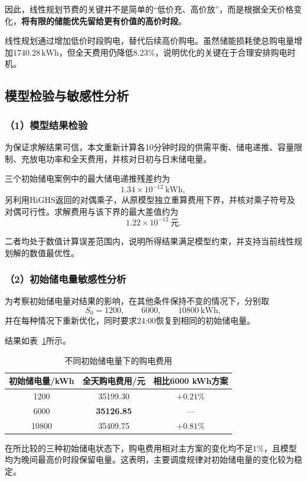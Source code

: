 因此，线性规划节费的关键并不是简单的“低价充、高价放”，而是根据全天价格变化，\textbf{将有限的储能优先留给更有价值的高价时段}。

线性规划通过增加低价时段购电，替代后续高价购电。虽然储能损耗使总购电量增加\(1740.28\,\mathrm{kWh}\)，但全天费用仍降低8.23\%，说明优化的关键在于合理安排购电时机。

\subsection{模型检验与敏感性分析}

\subsubsection*{（1）模型结果检验}

为保证求解结果可信，本文重新计算各10分钟时段的供需平衡、储电递推、容量限制、充放电功率和全天费用，并核对日初与日末储电量。

三个初始储电案例中的最大储电递推残差约为
\[
1.34\times10^{-12}\ \mathrm{kWh},
\]
另利用HiGHS返回的对偶乘子，从原模型独立重算费用下界，并核对乘子符号及对偶可行性。求解费用与该下界的最大差值约为
\[
1.22\times10^{-12}\ \text{元}.
\]

二者均处于数值计算误差范围内，说明所得结果满足模型约束，并支持当前线性规划解的数值最优性。

\subsubsection*{（2）初始储电量敏感性分析}

为考察初始储电量对结果的影响，在其他条件保持不变的情况下，分别取
\[
S_0=1200,\qquad 6000,\qquad 10800\ \mathrm{kWh},
\]
并在每种情况下重新优化，同时要求24:00恢复到相同的初始储电量。

结果如表~\ref{tab:q1_sensitivity}所示。

\begin{table}[H]
    \centering
    \caption{不同初始储电量下的购电费用}
    \label{tab:q1_sensitivity}
    \begin{tabular}{ccc}
        \toprule
        初始储电量/kWh & 全天购电费用/元 & 相比6000 kWh方案 \\
        \midrule
        1200 & 35199.30 & $+0.21\%$ \\
        6000 & \textbf{35126.85} & --- \\
        10800 & 35409.75 & $+0.81\%$ \\
        \bottomrule
    \end{tabular}
\end{table}

在所比较的三种初始储电状态下，购电费用相对主方案的变化均不足\(1\%\)，且模型均为晚间最高价时段保留电量。这表明，主要调度规律对初始储电量的变化较为稳定。
